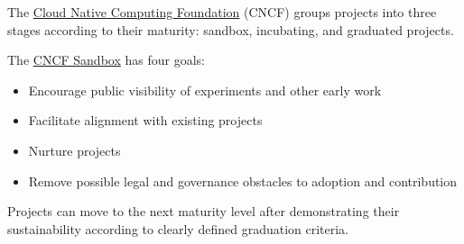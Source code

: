 \begin{kaobox}[frametitle=CNCF Sandbox]

The \href{https://www.cncf.io/}{Cloud Native Computing Foundation} (CNCF) groups projects into three stages according to their maturity: sandbox, incubating, and graduated projects.

The \href{https://www.cncf.io/sandbox-projects/}{CNCF Sandbox} has four goals:

\begin{itemize}

\item Encourage public visibility of experiments and other early work

\item Facilitate alignment with existing projects

\item Nurture projects

\item Remove possible legal and governance obstacles to adoption and contribution

\end{itemize}

Projects can move to the next maturity level after demonstrating their sustainability according to clearly defined graduation criteria.

\end{kaobox}

